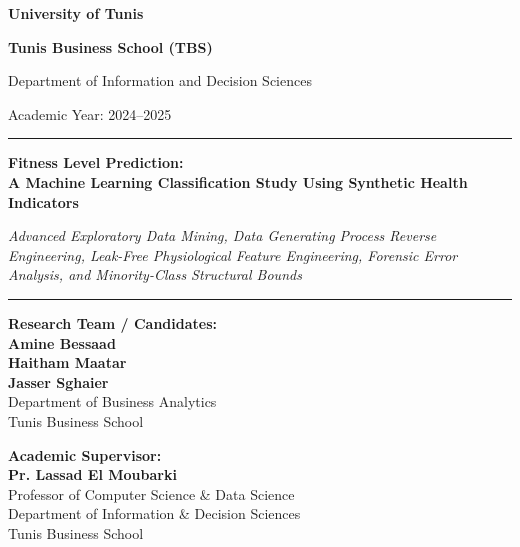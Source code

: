 \documentclass[11pt,a4paper]{article}
\begin{document}
\begin{titlepage}
\centering
\vspace*{0.8cm}

{\Large\bfseries\color{tbsblue} University of Tunis \par}
\vspace{0.15cm}
{\large\bfseries\color{tbsblue} Tunis Business School (TBS) \par}
\vspace{0.12cm}
{\normalsize Department of Information and Decision Sciences \par}
\vspace{0.08cm}
{\small Academic Year: 2024--2025 \par}

\vspace{1.5cm}
\noindent\rule{\linewidth}{1.2pt}
\vspace{0.35cm}

{\LARGE\bfseries Fitness Level Prediction:\\[4pt]
A Machine Learning Classification Study Using Synthetic Health Indicators \par}
\vspace{0.35cm}
{\large\itshape Advanced Exploratory Data Mining, Data Generating Process Reverse Engineering, Leak-Free Physiological Feature Engineering, Forensic Error Analysis, and Minority-Class Structural Bounds \par}

\vspace{0.35cm}
\noindent\rule{\linewidth}{1.2pt}

\vspace{1.5cm}

\begin{minipage}[t]{0.48\textwidth}
\textbf{Research Team / Candidates:}\\[4pt]
\textbf{Amine Bessaad}\\
\textbf{Haitham Maatar}\\
\textbf{Jasser Sghaier}\\[6pt]
\small Department of Business Analytics\\
\small Tunis Business School
\end{minipage}
\hfill
\begin{minipage}[t]{0.48\textwidth}
\raggedleft
\textbf{Academic Supervisor:}\\[4pt]
\textbf{Pr. Lassad El Moubarki}\\
\small Professor of Computer Science \& Data Science\\
\small Department of Information \& Decision Sciences\\
\small Tunis Business School
\end{minipage}


\end{titlepage}
\end{document}
